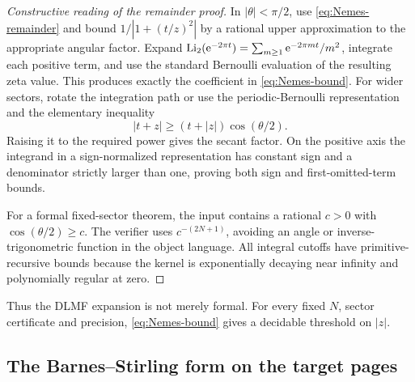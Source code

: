 \begin{proof}[Constructive reading of the remainder proof]
In \(|\theta|<\pi/2\), use \cref{eq:Nemes-remainder} and bound
\(1/|1+(t/z)^2|\) by a rational upper approximation to the appropriate angular
factor.  Expand
\(
\operatorname{Li}_2(\mathrm e^{-2\pi t})
 =\sum_{m\ge1}\mathrm e^{-2\pi mt}/m^2
\), integrate each positive term, and use the standard Bernoulli evaluation of
the resulting zeta value.  This produces exactly the coefficient in
\cref{eq:Nemes-bound}.  For wider sectors, rotate the integration path or use
the periodic-Bernoulli representation and the elementary inequality
\[
 |t+z|\ge (t+|z|)\cos(\theta/2).
\]
Raising it to the required power gives the secant factor.  On the positive
axis the integrand in a sign-normalized representation has constant sign and a
denominator strictly larger than one, proving both sign and first-omitted-term
bounds.

For a formal fixed-sector theorem, the input contains a rational
\(c>0\) with
\(
\cos(\theta/2)\ge c
\).
The verifier uses \(c^{-(2N+1)}\), avoiding an angle or inverse-trigonometric
function in the object language.  All integral cutoffs have primitive-recursive
bounds because the kernel is exponentially decaying near infinity and
polynomially regular at zero.
\end{proof}

Thus the DLMF expansion is not merely formal.  For every fixed \(N\), sector
certificate and precision, \cref{eq:Nemes-bound} gives a decidable threshold on
\(|z|\).

\subsection{The Barnes--Stirling form on the target pages}

